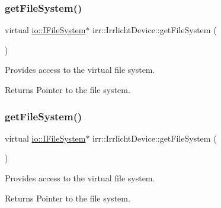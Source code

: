 \subsubsection{\texorpdfstring{get\+File\+System()}{getFileSystem()}\hspace{0.1cm}{\footnotesize\ttfamily [1/2]}}
{\footnotesize\ttfamily virtual \hyperlink{classirr_1_1io_1_1IFileSystem}{io\+::\+I\+File\+System}$\ast$ irr\+::\+Irrlicht\+Device\+::get\+File\+System (\begin{DoxyParamCaption}{ }\end{DoxyParamCaption})\hspace{0.3cm}{\ttfamily [pure virtual]}}



Provides access to the virtual file system. 

\begin{DoxyReturn}{Returns}
Pointer to the file system. 
\end{DoxyReturn}
\mbox{\label{classirr_1_1IrrlichtDevice_a3d8d2dee2f57aa7e6c0d14592de3e6ed}} 
\subsubsection{\texorpdfstring{get\+File\+System()}{getFileSystem()}\hspace{0.1cm}{\footnotesize\ttfamily [2/2]}}
{\footnotesize\ttfamily virtual \hyperlink{classirr_1_1io_1_1IFileSystem}{io\+::\+I\+File\+System}$\ast$ irr\+::\+Irrlicht\+Device\+::get\+File\+System (\begin{DoxyParamCaption}{ }\end{DoxyParamCaption})\hspace{0.3cm}{\ttfamily [pure virtual]}}



Provides access to the virtual file system. 

\begin{DoxyReturn}{Returns}
Pointer to the file system. 
\end{DoxyReturn}
\mbox{\label{classirr_1_1IrrlichtDevice_af7491b8c5ef4f71360f30fbad90ae35c}} 
